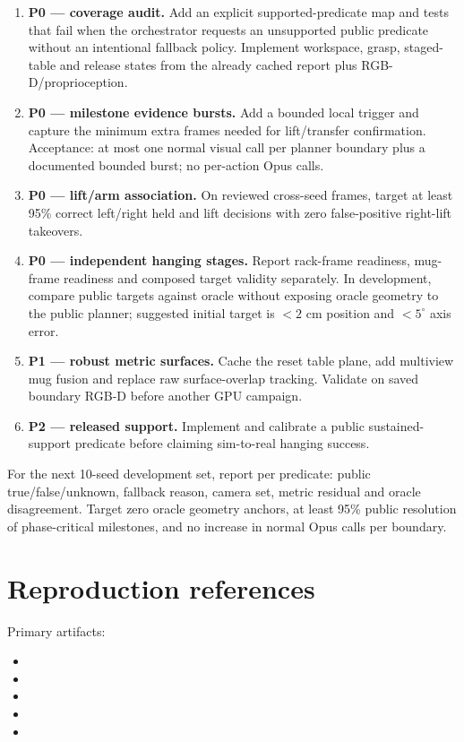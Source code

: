 \documentclass[10pt]{article}
\newcommand{\priority}[1]{\textbf{\color{BrickRed}#1}}
\begin{document}
\begin{enumerate}
  \item \priority{P0 --- coverage audit.} Add an explicit supported-predicate map and tests that
        fail when the orchestrator requests an unsupported public predicate without an intentional
        fallback policy. Implement workspace, grasp, staged-table and release states from the
        already cached report plus RGB-D/proprioception.
  \item \priority{P0 --- milestone evidence bursts.} Add a bounded local trigger and capture the
        minimum extra frames needed for lift/transfer confirmation. Acceptance: at most one normal
        visual call per planner boundary plus a documented bounded burst; no per-action Opus calls.
  \item \priority{P0 --- lift/arm association.} On reviewed cross-seed frames, target at least 95\%
        correct left/right held and lift decisions with zero false-positive right-lift takeovers.
  \item \priority{P0 --- independent hanging stages.} Report rack-frame readiness, mug-frame
        readiness and composed target validity separately. In development, compare public targets
        against oracle without exposing oracle geometry to the public planner; suggested initial
        target is $<2$ cm position and $<5^{\circ}$ axis error.
  \item \priority{P1 --- robust metric surfaces.} Cache the reset table plane, add multiview mug
        fusion and replace raw surface-overlap tracking. Validate on saved boundary RGB-D before
        another GPU campaign.
  \item \priority{P2 --- released support.} Implement and calibrate a public sustained-support
        predicate before claiming sim-to-real hanging success.
\end{enumerate}

For the next 10-seed development set, report per predicate: public true/false/unknown, fallback
reason, camera set, metric residual and oracle disagreement. Target zero oracle geometry anchors,
at least 95\% public resolution of phase-critical milestones, and no increase in normal Opus calls
per boundary.

\section*{Reproduction references}

Primary artifacts:
\begin{itemize}
  \item {}
  \item {}
  \item {}
  \item {}
  \item {}
\end{itemize}
\end{document}
